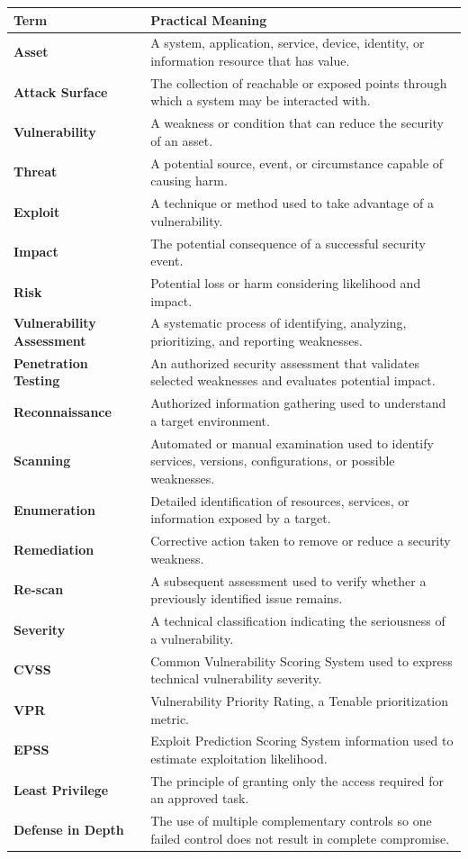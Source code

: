 \documentclass[11pt,a4paper]{article}
\begin{document}
\begin{longtable}{>{\bfseries}p{3.2cm}p{10.0cm}}
\toprule
Term & Practical Meaning\\
\midrule
Asset & A system, application, service, device, identity, or information resource that has value.\\
Attack Surface & The collection of reachable or exposed points through which a system may be interacted with.\\
Vulnerability & A weakness or condition that can reduce the security of an asset.\\
Threat & A potential source, event, or circumstance capable of causing harm.\\
Exploit & A technique or method used to take advantage of a vulnerability.\\
Impact & The potential consequence of a successful security event.\\
Risk & Potential loss or harm considering likelihood and impact.\\
Vulnerability Assessment & A systematic process of identifying, analyzing, prioritizing, and reporting weaknesses.\\
Penetration Testing & An authorized security assessment that validates selected weaknesses and evaluates potential impact.\\
Reconnaissance & Authorized information gathering used to understand a target environment.\\
Scanning & Automated or manual examination used to identify services, versions, configurations, or possible weaknesses.\\
Enumeration & Detailed identification of resources, services, or information exposed by a target.\\
Remediation & Corrective action taken to remove or reduce a security weakness.\\
Re-scan & A subsequent assessment used to verify whether a previously identified issue remains.\\
Severity & A technical classification indicating the seriousness of a vulnerability.\\
CVSS & Common Vulnerability Scoring System used to express technical vulnerability severity.\\
VPR & Vulnerability Priority Rating, a Tenable prioritization metric.\\
EPSS & Exploit Prediction Scoring System information used to estimate exploitation likelihood.\\
Least Privilege & The principle of granting only the access required for an approved task.\\
Defense in Depth & The use of multiple complementary controls so one failed control does not result in complete compromise.\\
\bottomrule
\end{longtable}
\end{document}
